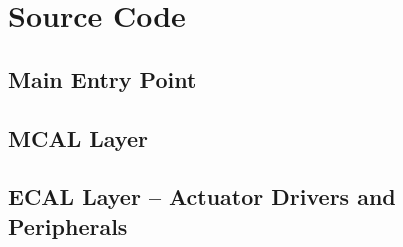\appendix
\section{Source Code}

\subsection{Main Entry Point}


\subsection{MCAL Layer}




\subsection{ECAL Layer -- Actuator Drivers and Peripherals}
















